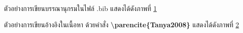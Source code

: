\hspace*{1.5em} %
ตัวอย่างการเขียนบรรณานุกรมในไฟล์ .bib แสดงได้ดังภาพที่ \ref{fig3:ExampleBib}

\begin{figure}[htbp]
\centering
{}
\caption{}
\label{fig3:ExampleBib}
\end{figure}

\hspace*{1.5em} %
ตัวอย่างการเขียนอ้างอิงในเนื้อหา ด้วยคำสั่ง \textbf{\textbackslash parencite\{Tanya2008\}} แสดงได้ดังภาพที่ \ref{fig3:ExampleRefInContent}

\begin{figure}[htbp]
\centering
{}
\caption{}
\label{fig3:ExampleRefInContent}
\end{figure}


